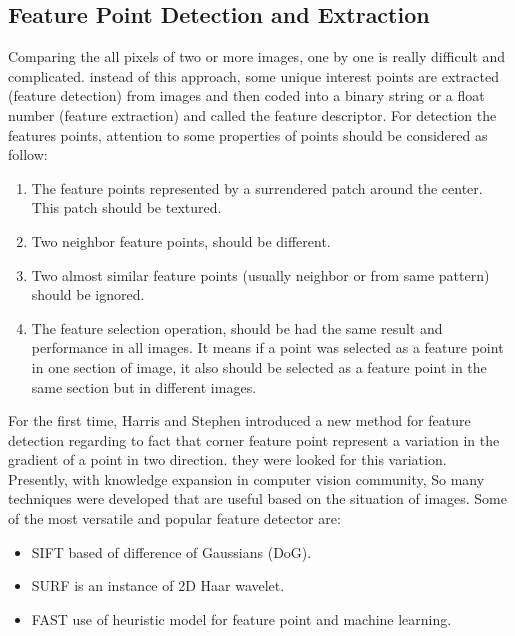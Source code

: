 \subsection{Feature Point Detection and Extraction}
Comparing the all pixels of two or more images, one by one is really difficult and complicated. instead of this approach, some unique interest points are extracted (feature detection) from images and then coded into a binary string or a float number (feature extraction) and called the feature descriptor. For detection the features points, attention to some properties of points should be considered as follow: \cite{forstner1986feature}
\begin{enumerate}
  \item The feature points represented by a surrendered patch around the center. This patch should be textured.
  \item Two neighbor feature points, should be different.
  \item Two almost similar feature points (usually neighbor or from same pattern) should be ignored.
  \item The feature selection operation, should be had the same result and performance in all images. It means if a point was selected as a feature point in one section of image, it also should be selected as a feature point in the same section but in different images.
\end{enumerate}
For the first time, Harris and Stephen \cite{harris1988combined} introduced a new method for feature detection regarding to fact that corner feature point represent a variation in the gradient of a point in two direction. they were looked for this variation.\\
Presently, with knowledge expansion in computer vision community, So many techniques were developed that are useful based on the situation of images. Some of the most versatile and popular feature detector are:
\begin{itemize}
\item SIFT \cite{lowe2004distinctive} based of difference of Gaussians (DoG).
\item SURF \cite{bay2006surf} is an instance of 2D Haar wavelet.
\item FAST \cite{rosten2010faster} use of heuristic model for feature point and machine learning.
\end{itemize}

